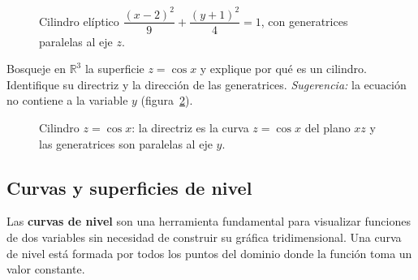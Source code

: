 \begin{figure}[!htbp]
\centering
{}
\caption{Cilindro elíptico $\dfrac{(x-2)^2}{9}+\dfrac{(y+1)^2}{4}=1$, con
  generatrices paralelas al eje $z$.}
\label{fig:cilindro_eliptico}
\end{figure}

\begin{prob}
Bosqueje en $\mathbb{R}^3$ la superficie $z=\cos x$ y explique por qué es un
cilindro. Identifique su directriz y la dirección de las generatrices.
\emph{Sugerencia:} la ecuación no contiene a la variable $y$
(figura~\ref{fig:cilindro_coseno}).
\end{prob}

\begin{figure}[!htbp]
\centering
{}
\caption{Cilindro $z=\cos x$: la directriz es la curva $z=\cos x$ del plano
  $xz$ y las generatrices son paralelas al eje $y$.}
\label{fig:cilindro_coseno}
\end{figure}

\subsection{Curvas y superficies de nivel}

Las \textbf{curvas de nivel} son una herramienta fundamental para
visualizar funciones de dos variables sin necesidad de construir su
gráfica tridimensional. Una curva de nivel está formada por todos los
puntos del dominio donde la función toma un valor constante.

